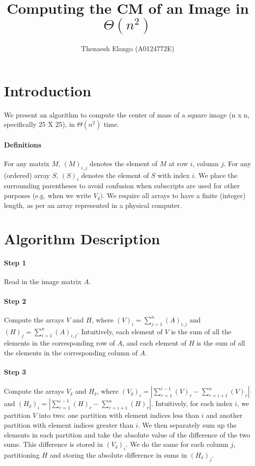 \documentclass[]{article}
\title{Computing the CM of an Image in $\Theta(n^2)$}
\author{Thenaesh Elango (A0124772E)}
\begin{document}
	
	
	\maketitle
	
	\section{Introduction}
		\paragraph{}
		We present an algorithm to compute the center of mass of a square image (n x n, specifically 25 X 25), in $\Theta(n^2)$ time.
		
		\paragraph{Definitions}
		For any matrix $M$, $(M)_{i,j}$ denotes the element of $M$ at row $i$, column $j$. For any (ordered) array $S$, $(S)_i$ denotes the element of $S$ with index $i$. We place the surrounding parentheses to avoid confusion when subscripts are used for other purposes (e.g. when we write $V_\delta)$. We require all arrays to have a finite (integer) length, as per an array represented in a physical computer.
		
	\section{Algorithm Description}
		\paragraph{Step 1}
		Read in the image matrix $A$.
		\paragraph{Step 2}
		Compute the arrays $V$ and $H$, where $(V)_i = \sum\nolimits_{j = 1}^n (A)_{i,j}$ and $(H)_j = \sum\nolimits_{i = 1}^n (A)_{i,j}$. Intuitively, each element of $V$ is the sum of all the elements in the corresponding row of $A$, and each element of $H$ is the sum of all the elements in the corresponding column of $A$.
		\paragraph{Step 3}
		Compute the arrays $V_\delta$ and $H_\delta$, where $(V_\delta)_i = |\sum\nolimits_{r = 1}^{i - 1} (V)_r - \sum\nolimits_{r = i + 1}^{n} (V)_r|$ and $(H_\delta)_i = |\sum\nolimits_{r = 1}^{i - 1} (H)_r - \sum\nolimits_{r = i + 1}^{n} (H)_r|$. Intuitively, for each index $i$, we partition $V$ into two: one partition with element indices less than $i$ and another partition with element indices greater than $i$. We then separately sum up the elements in each partition and take the absolute value of the difference of the two sums. This difference is stored in $(V_\delta)_i.$ We do the same for each column $j$, partitioning $H$ and storing the absolute difference in sums in $(H_\delta)_j$.
		
\end{document}
